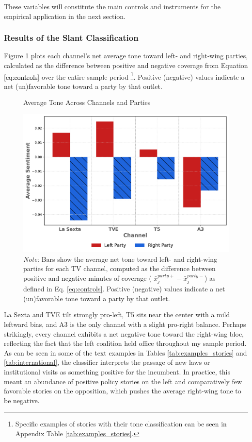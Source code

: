 \documentclass[12pt]{article}
\begin{document}
	
	
		These variables will constitute the main controls and instruments for the empirical application in the next section. 
	

		\subsubsection*{Results of the Slant Classification}
	
	
	
	Figure \ref{fig:chat} plots each channel’s net average tone toward left‐ and right‐wing parties, calculated as the difference between positive and negative coverage from Equation \ref{eq:controls} over the entire sample period \footnote{Specific examples of stories with their tone classification can be seen in Appendix Table \ref{tab:examples_stories}.}. Positive (negative) values indicate a net (un)favorable tone toward a party by that outlet. 
	
		\begin{figure}[!htbp]
		\caption{Average Tone Across Channels and Parties}
		\centering
		\includegraphics[width=120mm]{figures/chatgpt}
		\caption*{\small \textit{Note:} Bars show the average net tone toward left- and right-wing parties for each TV channel, computed as the difference between positive and negative minutes of coverage ( $	\bar{x}_j^{party+}-\bar{x}_j^{party-}$) as defined in Eq. \ref{eq:controls}. Positive (negative) values indicate a net (un)favorable tone toward a party by that outlet.}
		\label{fig:chat}
	\end{figure}
	
	La Sexta and TVE tilt strongly pro-left, T5 sits near the center with a mild leftward bias, and A3 is the only channel  with a slight pro-right balance. Perhaps strikingly, every channel exhibits a net negative tone toward the right-wing bloc, reflecting the fact that the left coalition held office throughout my sample period. As can be seen in some of the text examples in Tables \ref{tab:examples_stories} and \ref{tab:international}, the classifier interprets the passage of new laws or institutional visits as something positive for the incumbent. In practice, this meant an abundance of positive policy stories on the left and comparatively few favorable stories on the opposition, which pushes the average right-wing tone to be negative.
	
\end{document}
